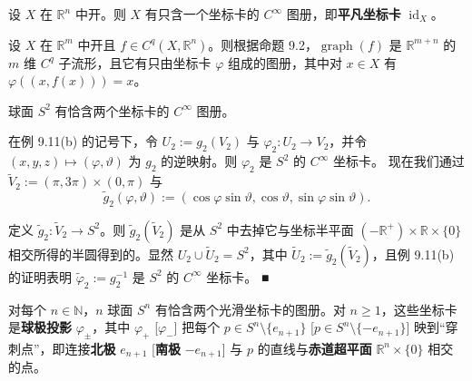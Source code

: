 \begin{example}

\begin{items}
\item

设 $ X $ 在 $ \mathbb{R}^{n} $ 中开。则 $ X $ 有只含一个坐标卡的 $ C^{\infty} $ 图册，即\textbf{平凡坐标卡} $ \operatorname{id}_{X} $。

\item

设 $ X $ 在 $ \mathbb{R}^{m} $ 中开且 $ f \in C^{q}(X, \mathbb{R}^{n}) $。则根据命题 9.2，$ \operatorname{graph}(f) $ 是 $ \mathbb{R}^{m+n} $ 的 $ m $ 维 $ C^{q} $ 子流形，且它有只由坐标卡 $ \varphi $ 组成的图册，其中对 $ x \in X $ 有 $ \varphi((x, f(x))) = x $。

\item

球面 $ S^{2} $ 有恰含两个坐标卡的 $ C^{\infty} $ 图册。

\proofhead
在例 9.11(b) 的记号下，令 $ U_{2} := g_{2}(V_{2}) $ 与 $ \varphi_{2} : U_{2} \to V_{2} $，并令 $ (x, y, z) \mapsto (\varphi, \vartheta) $ 为 $ g_{2} $ 的逆映射。则 $ \varphi_{2} $ 是 $ S^{2} $ 的 $ C^{\infty} $ 坐标卡。
现在我们通过 $ \tilde{V}_{2} := (\pi, 3\pi) \times (0, \pi) $ 与
\[
\tilde{g}_{2}(\varphi, \vartheta) := (\cos\varphi\sin\vartheta, \cos\vartheta, \sin\varphi\sin\vartheta) .
\]

定义 $ \tilde{g}_{2} : \tilde{V}_{2} \to S^{2} $。则 $ \tilde{g}_{2}(\tilde{V}_{2}) $ 是从 $ S^{2} $ 中去掉它与坐标半平面 $ (-\mathbb{R}^{+}) \times \mathbb{R} \times \{0\} $ 相交所得的半圆得到的。显然 $ U_{2} \cup \tilde{U}_{2} = S^{2} $，其中 $ \tilde{U}_{2} := \tilde{g}_{2}(\tilde{V}_{2}) $，且例 9.11(b) 的证明表明 $ \tilde{\varphi}_{2} := g_{2}^{-1} $ 是 $ S^{2} $ 的 $ C^{\infty} $ 坐标卡。 \nobreak\hspace{0.35em}■

\item

对每个 $ n \in \mathbb{N} $，$ n $ 球面 $ S^{n} $ 有恰含两个光滑坐标卡的图册。对 $ n \ge 1 $，这些坐标卡是\textbf{球极投影} $ \varphi_{\pm} $，其中 $ \varphi_{+} $ [$ \varphi_{-} $] 把每个 $ p \in S^{n}\setminus\{e_{n+1}\} $ [$ p \in S^{n}\setminus\{-e_{n+1}\} $] 映到“穿刺点”，即连接\textbf{北极} $ e_{n+1} $ [\textbf{南极} $ -e_{n+1} $] 与 $ p $ 的直线与\textbf{赤道超平面} $ \mathbb{R}^{n} \times \{0\} $ 相交的点。

\end{items}



\end{example}

